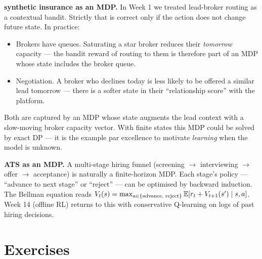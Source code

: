\documentclass[11pt,oneside]{scrbook}
\begin{document}
\begin{matching}
\textbf{synthetic insurance as an MDP.} In Week 1 we treated lead-broker routing as a
contextual bandit. Strictly that is correct only if the action does not change
future state. In practice:
\begin{itemize}\setlength\itemsep{1pt}
  \item Brokers have queues. Saturating a star broker reduces their
        \emph{tomorrow} capacity --- the bandit reward of routing to them is
        therefore part of an MDP whose state includes the broker queue.
  \item Negotiation. A broker who declines today is less likely to be offered
        a similar lead tomorrow --- there is a softer state in their
        ``relationship score'' with the platform.
\end{itemize}
Both are captured by an MDP whose state augments the lead context with a
slow-moving broker capacity vector. With finite states this MDP could be
solved by exact DP --- it is the example par excellence to motivate
\emph{learning} when the model is unknown.

\textbf{ATS as an MDP.} A multi-stage hiring funnel (screening
$\to$ interviewing $\to$ offer $\to$ acceptance) is naturally a finite-horizon
MDP. Each stage's policy --- ``advance to next stage'' or ``reject'' --- can
be optimised by backward induction. The Bellman equation reads
$V_t(s) = \max_{a\in\{\text{advance, reject}\}} \mathbb{E}[r_t + V_{t+1}(s')\mid s,a]$.
Week 14 (offline RL) returns to this with conservative Q-learning on logs
of past hiring decisions.
\end{matching}

\chapter{Exercises}
\end{document}
